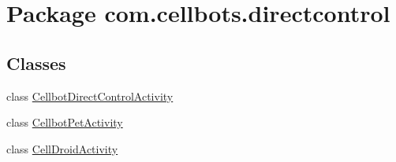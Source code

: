 \hypertarget{namespacecom_1_1cellbots_1_1directcontrol}{\section{Package com.\-cellbots.\-directcontrol}
\label{namespacecom_1_1cellbots_1_1directcontrol}
}
\subsection*{Classes}
\begin{DoxyCompactItemize}
\item 
class \hyperlink{classcom_1_1cellbots_1_1directcontrol_1_1_cellbot_direct_control_activity}{Cellbot\-Direct\-Control\-Activity}
\item 
class \hyperlink{classcom_1_1cellbots_1_1directcontrol_1_1_cellbot_pet_activity}{Cellbot\-Pet\-Activity}
\item 
class \hyperlink{classcom_1_1cellbots_1_1directcontrol_1_1_cell_droid_activity}{Cell\-Droid\-Activity}
\end{DoxyCompactItemize}
